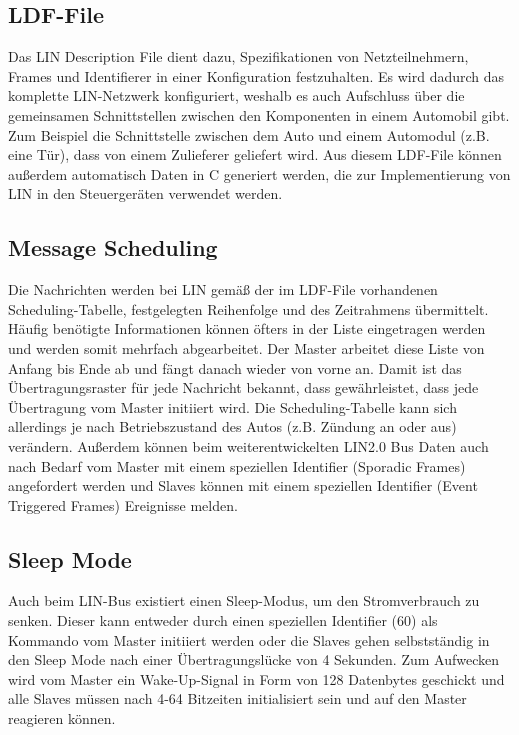     \subsection{LDF-File}
    Das \ac{LIN} Description File dient dazu, Spezifikationen von Netzteilnehmern, Frames und Identifierer in einer Konfiguration festzuhalten.
    Es wird dadurch das komplette \ac{LIN}-Netzwerk konfiguriert, weshalb es auch Aufschluss über die gemeinsamen Schnittstellen zwischen den Komponenten in einem Automobil gibt.
    Zum Beispiel die Schnittstelle zwischen dem Auto und einem Automodul (z.B. eine Tür), dass von einem Zulieferer geliefert wird.
    Aus diesem \ac{LDF}-File können außerdem automatisch Daten in C generiert werden, die zur Implementierung von \ac{LIN} in den Steuergeräten verwendet werden.

    \subsection{Message Scheduling}
    Die Nachrichten werden bei \ac{LIN} gemäß der im \ac{LDF}-File vorhandenen Scheduling-Tabelle, festgelegten Reihenfolge und des Zeitrahmens übermittelt.
    Häufig benötigte Informationen können öfters in der Liste eingetragen werden und werden somit mehrfach abgearbeitet.
    Der Master arbeitet diese Liste von Anfang bis Ende ab und fängt danach wieder von vorne an.
    Damit ist das Übertragungsraster für jede Nachricht bekannt, dass gewährleistet, dass jede Übertragung vom Master initiiert wird. 
    Die Scheduling-Tabelle kann sich allerdings je nach Betriebszustand des Autos (z.B. Zündung an oder aus) verändern.
    Außerdem können beim weiterentwickelten \ac{LIN}2.0 Bus Daten auch nach Bedarf vom Master mit einem speziellen Identifier (Sporadic Frames) angefordert werden und Slaves können mit einem speziellen Identifier (Event Triggered Frames) Ereignisse melden.

    \subsection{Sleep Mode}
    Auch beim LIN-Bus existiert einen Sleep-Modus, um den Stromverbrauch zu senken.
    Dieser kann entweder durch einen speziellen Identifier (60) als Kommando vom Master initiiert werden oder die Slaves gehen selbstständig in den Sleep Mode nach einer Übertragungslücke von 4 Sekunden.
    Zum Aufwecken wird vom Master ein Wake-Up-Signal in Form von 128 Datenbytes geschickt und alle Slaves müssen nach 4-64 Bitzeiten initialisiert sein und auf den Master reagieren können.
